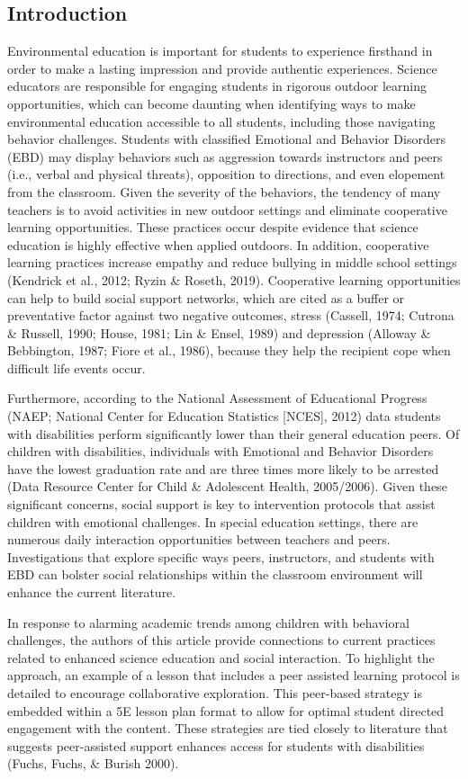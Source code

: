 \documentclass[11pt]{sig-alternate}
\begin{document}
\begin{large}
\section*{Introduction}
Environmental education is important for students to experience firsthand in order to make a lasting impression and provide authentic experiences. Science educators are responsible for engaging students in rigorous outdoor learning opportunities, which can become daunting when identifying ways to make environmental education accessible to all students, including those navigating behavior challenges. Students with classified Emotional and Behavior Disorders (EBD) may display behaviors such as aggression towards instructors and peers (i.e., verbal and physical threats), opposition to directions, and even elopement from the classroom. Given the severity of the behaviors, the tendency of many teachers is to avoid activities in new outdoor settings and eliminate cooperative learning opportunities. These practices occur despite evidence that science education is highly effective when applied outdoors. In addition, cooperative learning practices increase empathy and reduce bullying in middle school settings (Kendrick et al., 2012; Ryzin \& Roseth, 2019). Cooperative learning opportunities can help to build social support networks, which are cited as a buffer or preventative factor against two negative outcomes, stress (Cassell, 1974; Cutrona \& Russell, 1990; House, 1981; Lin \& Ensel, 1989) and depression (Alloway \& Bebbington, 1987; Fiore et al., 1986), because they help the recipient cope when difficult life events occur.

Furthermore, according to the National Assessment of Educational Progress (NAEP; National Center for Education Statistics [NCES], 2012) data students with disabilities perform significantly lower than their general education peers. Of children with disabilities, individuals with Emotional and Behavior Disorders have the lowest graduation rate and are three times more likely to be arrested (Data Resource Center for Child \& Adolescent Health, 2005/2006). Given these significant concerns, social support is key to intervention protocols that assist children with emotional challenges. In special education settings, there are numerous daily interaction opportunities between teachers and peers. Investigations that explore specific ways peers, instructors, and students with EBD can bolster social relationships within the classroom environment will enhance the current literature. 

In response to alarming academic trends among children with behavioral challenges, the authors of this article provide connections to current practices related to enhanced science education and social interaction. To highlight the approach, an example of a lesson that includes a peer assisted learning protocol is detailed to encourage collaborative exploration. This peer-based strategy is embedded within a 5E lesson plan format to allow for optimal student directed engagement with the content. These strategies are tied closely to literature that suggests peer-assisted support enhances access for students with disabilities (Fuchs, Fuchs, \& Burish 2000). 


\end{large}
\end{document}
